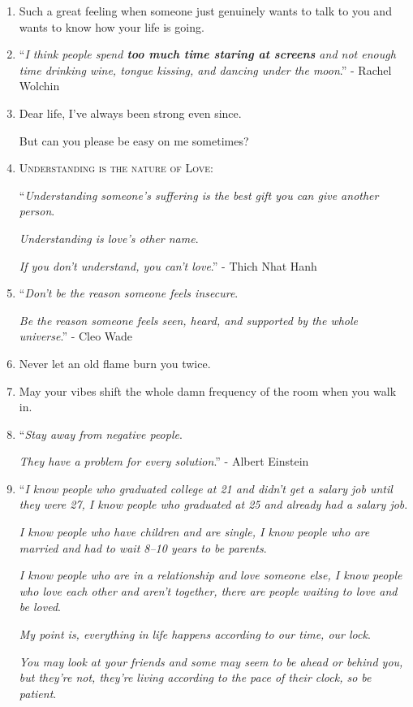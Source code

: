 \documentclass{article}
\numberwithin{equation}{section}
\begin{document}
\begin{enumerate}
    Money can always return.
    
    Time will not.
    \item Such a great feeling when someone just genuinely wants to talk to you and wants to know how your life is going.
    \item ``\textit{I think people spend \textbf{too much time staring at screens} and not enough time drinking wine, tongue kissing, and dancing under the moon}.'' - Rachel Wolchin
    \item Dear life, I've always been strong even since.
    
    But can you please be easy on me sometimes?
    \item \textsc{Understanding is the nature of Love}:
    
    ``\textit{Understanding someone's suffering is the best gift you can give another person}.
    
    \textit{Understanding is love's other name}.
    
    \textit{If you don't understand, you can't love}.'' - Thich Nhat Hanh
    \item ``\textit{Don't be the reason someone feels insecure}.
    
    \textit{Be the reason someone feels seen, heard, and supported by the whole universe}.'' - Cleo Wade
    \item Never let an old flame burn you twice.
    \item May your vibes shift the whole damn frequency of the room when you walk in.
    \item ``\textit{Stay away from negative people}.
    
    \textit{They have a problem for every solution}.'' - Albert Einstein
    \item ``\textit{I know people who graduated college at 21 and didn't get a salary job until they were 27, I know people who graduated at 25 and already had a salary job}.
    
    \textit{I know people who have children and are single, I know people who are married and had to wait 8--10 years to be parents}.
    
    \textit{I know people who are in a relationship and love someone else, I know people who love each other and aren't together, there are people waiting to love and be loved}.
    
    \textit{My point is, everything in life happens according to our time, our lock}.
    
    \textit{You may look at your friends and some may seem to be ahead or behind you, but they're not, they're living according to the pace of their clock, so be patient}.
    

\end{enumerate}
\end{document}

